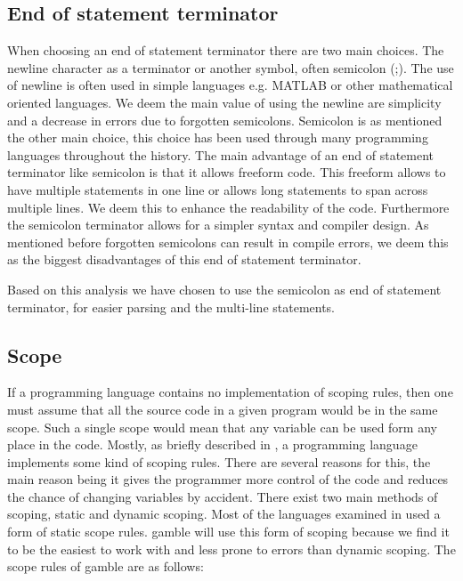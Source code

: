 \subsection*{End of statement terminator}
When choosing an end of statement terminator there are two main choices.
The newline character as a terminator or another symbol, often semicolon (;).
The use of newline is often used in simple languages e.g. MATLAB or other mathematical oriented languages. 
We deem the main value of using the newline are simplicity and a decrease in errors due to forgotten semicolons.
Semicolon is as mentioned the other main choice, this choice has been used through many programming languages throughout the history. 
The main advantage of an end of statement terminator like semicolon is that it allows freeform code. 
This freeform allows to have multiple statements in one line or allows long statements to span across multiple lines.
We deem this to enhance the readability of the code.
Furthermore the semicolon terminator allows for a simpler syntax and compiler design. 
As mentioned before forgotten semicolons can result in compile errors, we deem this as the biggest disadvantages of this end of statement terminator.

Based on this analysis we have chosen to use the semicolon as end of statement terminator, for easier parsing and the multi-line statements.

\subsection*{Scope}\label{subsec:Scope}
If a programming language contains no implementation of scoping rules, then one must assume that all the source code in a given program would be in the same scope.
Such a single scope would mean that any variable can be used form any place in the code. 
Mostly, as briefly described in , a programming language implements some kind of scoping rules.
There are several reasons for this, the main reason being it gives the programmer more control of the code and reduces the chance of changing variables by accident.
There exist two main methods of scoping, static and dynamic scoping.
Most of the languages examined in  used a form of static scope rules. 
\gls{gamble} will use this form of scoping because we find it to be the easiest to work with and less prone to errors than dynamic scoping.
The scope rules of \gls{gamble} are as follows:

